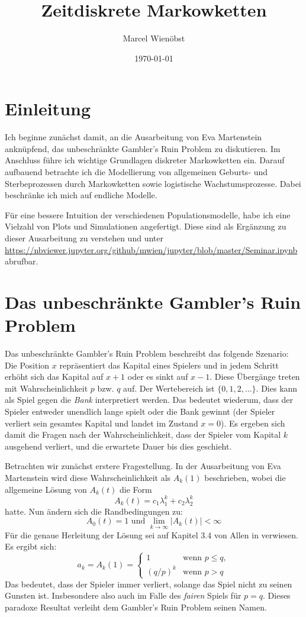 \documentclass{article}
\author{Marcel Wienöbst}
\date{\today}
\title{Zeitdiskrete Markowketten}
\begin{document}
\maketitle

\section{Einleitung}
Ich beginne zunächst damit, an die Ausarbeitung von Eva Martenstein \cite{eva}
anknüpfend, das unbeschränkte Gambler's Ruin Problem zu diskutieren. Im Anschluss führe ich wichtige Grundlagen diskreter Markowketten ein. Darauf aufbauend betrachte ich die Modellierung von allgemeinen Geburts- und Sterbeprozessen durch Markowketten sowie logistische Wachstumsprozesse. Dabei beschränke ich mich auf endliche Modelle.

Für eine bessere Intuition der verschiedenen Populationsmodelle, habe ich eine Vielzahl von Plots und Simulationen angefertigt. Diese sind als Ergänzung zu dieser Ausarbeitung zu verstehen und unter \href{https://nbviewer.jupyter.org/github/mwien/jupyter/blob/master/Seminar.ipynb}{https://nbviewer.jupyter.org/github/mwien/jupyter/blob/master/Seminar.ipynb} abrufbar.
\section{Das unbeschränkte Gambler's Ruin Problem}
Das unbeschränkte Gambler's Ruin Problem beschreibt das folgende Szenario:
Die Position $x$ repräsentiert das Kapital eines Spielers und in jedem Schritt erhöht sich das Kapital auf $x+1$ oder es sinkt auf $x-1$. Diese Übergänge treten mit Wahrscheinlichkeit $p$ bzw{.} $q$ auf. Der Wertebereich ist $\{0,1,2,\dots\}$. Dies kann als Spiel gegen die \emph{Bank} interpretiert werden. Das bedeutet wiederum, dass der Spieler entweder unendlich lange spielt oder die Bank gewinnt (der Spieler verliert sein gesamtes Kapital und landet im Zustand $x = 0$). Es ergeben sich damit die Fragen nach der Wahrscheinlichkeit, dass der Spieler vom Kapital $k$ ausgehend verliert, und die erwartete Dauer bis dies geschieht.

Betrachten wir zunächst erstere Fragestellung. In der Ausarbeitung von Eva Martenstein \cite{eva} wird diese Wahrscheinlichkeit als $A_k(1)$ beschrieben, wobei die allgemeine Lösung von $A_k(t)$ die Form
\[
  A_k(t) = c_1λ_1^k + c_2λ_2^k
\]
hatte. Nun ändern sich die Randbedingungen zu:
\[
  A_0(t) = 1 \text{ und } \lim_{k→∞}|A_k(t)| < ∞
\]
Für die genaue Herleitung der Lösung sei auf Kapitel 3.4 von Allen in \cite{allen} verwiesen. Es ergibt sich:
\[
  a_k = A_k(1) =
  \begin{cases}
    1 &\text{wenn } p \leq q, \\
    (q/p)^k &\text{wenn } p > q
  \end{cases}
\]
Das bedeutet, dass der Spieler immer verliert, solange das Spiel nicht zu seinen Gunsten ist. Insbesondere also auch im Falle des \emph{fairen} Spiels für $p = q$. Dieses paradoxe Resultat verleiht dem Gambler's Ruin Problem seinen Namen.
\end{document}
